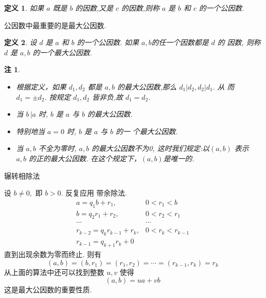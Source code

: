 \documentclass[13pt,fontset=mac]{ctexbeamer}
\newtheorem*{defi}{定义}
\newtheorem*{rem}{注}
\begin{document}
\begin{frame}
\begin{defi}
如果 $a$ 既是 $b$ 的因数,又是 $c$ 的因数,则称 $a$ 是 $b$ 和 $c$ 的一个\alert{公因数}.
\end{defi}
公因数中最重要的是最大公因数.

\begin{defi}
设 $d$ 是 $a$ 和 $b$ 的一个公因数. 如果 $a, b $的任一个因数都是 $d$ 的
因数, 则称 $d$ 是 $a, b$ 的一个\alert{最大公因数}.
\end{defi}

\begin{rem}
	\begin{itemize}
\item 根据定义，如果 $d_{1}, d_{2}$ 都是 $a, b$ 的最大公因数,那么 $d_{1}\left|d_{2}, d_{2}\right| d_{1} .$ 从
而 $d_{1}=\pm d_{2} .$
按规定 $d_{1}, d_{2}$ 皆非负,故 $d_{1}=d_{2}$.

\item 当 $b\,  | a$ 时, $b$ 是 $a$ 与 $b$ 的最大公因数.

\item 特别地当 $a=0$ 时, $b$ 是 $a$ 与 $b$ 的一 个最大公因数.

\item 当 $a, b$  不全为零时, $a,b$ 的最大公因数不为0,  这时我们规定:以$(a, b)$ 表示 $a, b$ 的正的最大公因数. 在这个规定下，$(a, b)$是唯一的.
\end{itemize}
\end{rem}
\end{frame}

\begin{frame}{辗转相除法}

设 $b \neq 0,$ 即 $b>0 .$ 反复应用 带余除法.
	\[
	\begin{array}{cc}
	a=q_{1} b+r_{1}, & 0<r_{1}<b \\
	b=q_{2} r_{1}+r_{2}, & 0<r_{2}<r_{1} \\
	\cdots  & \cdots  \\
	r_{k-2}=q_{k} r_{k-1}+r_{k}, & 0<r_{k}<r_{k-1} \\
	r_{k-1}=q_{k+1} r_{k}+0
	\end{array}
	\]
	直到出现余数为零而终止. 则有
	\[
	(a, b)=\left(b, r_{1}\right)=\left(r_{1}, r_{2}\right)=\cdots=\left(r_{k-1}, r_{k}\right)=r_{k}
	\]
	从上面的算法中还可以找到整数 $u, v$ 使得
	\[
	(a, b)=u a+v b
	\]
	这是最大公因数的重要性质.
\end{frame}
\end{document}
